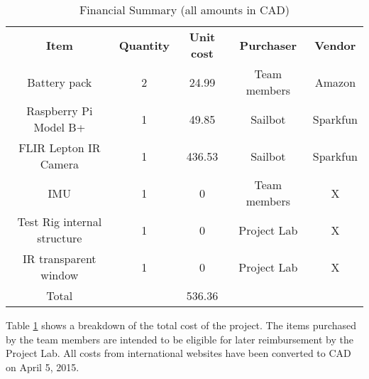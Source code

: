 
\begin{table}
\caption{\label{tab:financialsummary}Financial Summary (all amounts in CAD)}
\begin{tabular}{c|c|c|c|c}
\textbf{Item} & \textbf{Quantity} & \textbf{Unit cost} & \textbf{Purchaser} & \textbf{Vendor}\\
Battery pack & 2 & 24.99 & Team members & Amazon\\
Raspberry Pi Model B+ & 1 & 49.85 & Sailbot & Sparkfun\\
FLIR Lepton IR Camera & 1 & 436.53 & Sailbot & Sparkfun\\
IMU & 1 & 0 & Team members & X\\
Test Rig internal structure & 1 & 0 & Project Lab & X\\
IR transparent window & 1 & 0 & Project Lab & X\\\hline
Total & & 536.36 & & \\

\end{tabular}
\end{table}

Table \ref{tab:financialsummary} shows a breakdown of the total cost of the project. The items purchased by the team members are intended to be eligible for later reimbursement by the Project Lab. All costs from international websites have been converted to CAD on April 5, 2015.
